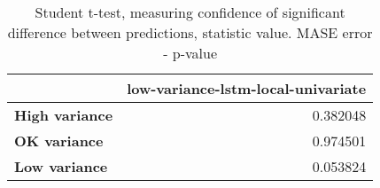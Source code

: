 \begin{table}[h]
\centering
\caption{Student t-test, measuring confidence of significant difference between predictions, statistic value. MASE error - p-value}
\label{table:ttest-p-values-variance-experiments-MASE}
\begin{tabular}{lr}
\toprule
{} &  low-variance-lstm-local-univariate \\
\midrule
\textbf{High variance} &                            0.382048 \\
\textbf{OK variance  } &                            0.974501 \\
\textbf{Low variance } &                            0.053824 \\
\bottomrule
\end{tabular}
\end{table}
